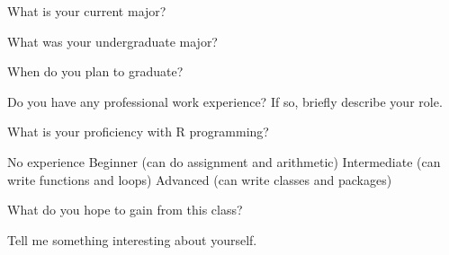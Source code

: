 \documentclass[12pt,addpoints,answers]{exam}%
\begin{document}
\runningfooter{}{}{}
\begin{center}
\makebox[\textwidth]{}
\end{center}






\begin{questions}

\question What is your current major?


\question What was your undergraduate major?


\question When do you plan to graduate?


\question Do you have any professional work experience?  If so, briefly describe your role.


\question What is your proficiency with R programming?
\begin{checkboxes}
\choice No experience
\choice Beginner (can do assignment and arithmetic)
\choice Intermediate (can write functions and loops)
\choice Advanced (can write classes and packages)
\end{checkboxes}


\question What do you hope to gain from this class?


\question Tell me something interesting about yourself.



















\end{questions}
\end{document}
